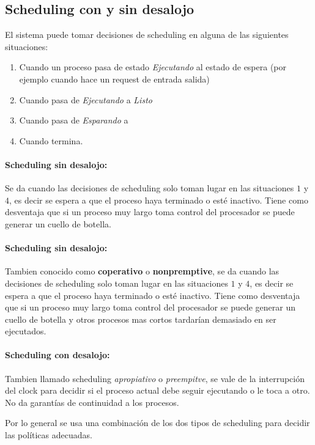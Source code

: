 	\subsection{Scheduling con y sin desalojo}
	
	El sistema puede tomar decisiones de scheduling en alguna de las siguientes situaciones:
	\begin{enumerate}
		\item Cuando un proceso pasa de estado \textit{Ejecutando} al estado de espera (por ejemplo cuando hace un request de entrada salida)
		\item Cuando pasa de \textit{Ejecutando} a \textit{Listo}
		\item Cuando pasa de \textit{Esparando} a 
		\item Cuando termina.
	\end{enumerate}

	\paragraph{Scheduling sin desalojo:} Se da cuando las decisiones de scheduling solo toman lugar en las situaciones $1$ y $4$, es decir se espera a que el proceso haya terminado o esté inactivo. Tiene como desventaja que si un proceso muy largo toma control del procesador se puede generar un cuello de botella.
	
	\paragraph{Scheduling sin desalojo:} Tambien conocido como \textbf{coperativo} o \textbf{nonpremptive}, se da cuando las decisiones de scheduling solo toman lugar en las situaciones $1$ y $4$, es decir se espera a que el proceso haya terminado o esté inactivo. Tiene como desventaja que si un proceso muy largo toma control del procesador se puede generar un cuello de botella y otros procesos mas cortos tardarían demasiado en ser ejecutados.
	
	\paragraph{Scheduling con desalojo:} Tambien llamado scheduling \textit{apropiativo} o \textit{preempitve}, se vale de la interrupción del clock para decidir si el proceso actual debe seguir ejecutando o le toca a otro. No da garantías de continuidad a los procesos.
	
	Por lo general se usa una combinación de los dos tipos de scheduling para decidir las políticas adecuadas.

